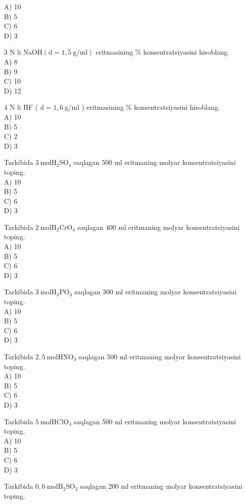 A) 10\\
B) 5\\
C) 6\\
D) 3
  \item 3 N li $\mathrm{NaOH}(\mathrm{d}=1,5 \mathrm{~g} / \mathrm{ml})$ eritmasining \% konsentratsiyasini hisoblang.\\
A) 8\\
B) 9\\
C) 10\\
D) 12
  \item 4 N li HF ( $\mathrm{d}=1,6 \mathrm{~g} / \mathrm{ml}$ ) eritmasining \% konsentratsiyasini hisoblang.\\
A) 10\\
B) 5\\
C) 2\\
D) 3
  \item Tarkibida $3 \mathrm{~mol} \mathrm{H}_{2} \mathrm{SO}_{4}$ saqlagan 500 ml eritmaning molyar konsentratsiyasini toping.\\
A) 10\\
B) 5\\
C) 6\\
D) 3
  \item Tarkibida $2 \mathrm{~mol} \mathrm{H}_{2} \mathrm{CrO}_{4}$ saqlagan 400 ml eritmaning molyar konsentratsiyasini toping.\\
A) 10\\
B) 5\\
C) 6\\
D) 3
  \item Tarkibida $3 \mathrm{~mol} \mathrm{H}_{3} \mathrm{PO}_{4}$ saqlagan 300 ml eritmaning molyar konsentratsiyasini toping.\\
A) 10\\
B) 5\\
C) 6\\
D) 3
  \item Tarkibida $2,5 \mathrm{~mol} \mathrm{HNO}_{3}$ saqlagan 500 ml eritmaning molyar konsentratsiyasini toping.\\
A) 10\\
B) 5\\
C) 6\\
D) 3
  \item Tarkibida $5 \mathrm{~mol} \mathrm{HClO}_{4}$ saqlagan 500 ml eritmaning molyar konsentratsiyasini toping.\\
A) 10\\
B) 5\\
C) 6\\
D) 3
  \item Tarkibida $0,6 \mathrm{~mol} \mathrm{H}_{2} \mathrm{SO}_{3}$ saqlagan 200 ml eritmaning molyar konsentratsiyasini toping.\\
